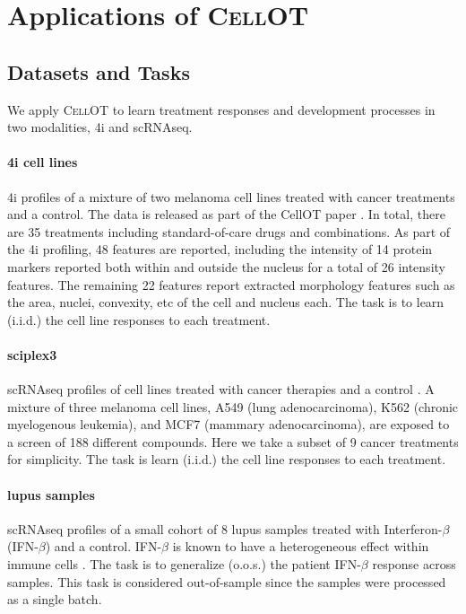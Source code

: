 \section{Applications of \textsc{CellOT}}
\subsection{Datasets and Tasks}

We apply \textsc{CellOT} to learn treatment responses and development processes in two modalities, 4i \cite{gut2018} and scRNAseq.

\paragraph{4i cell lines}
4i profiles of a mixture of two melanoma cell lines treated with cancer treatments and a control.
The data is released as part of the CellOT paper \cite{bunne2023}.
In total, there are 35 treatments including standard-of-care drugs and combinations.
As part of the 4i profiling, 48 features are reported, including the intensity of 14 protein markers reported both within and outside the nucleus for a total of 26 intensity features.
The remaining 22 features report extracted morphology features such as the area, nuclei, convexity, etc of the cell and nucleus each.
The task is to learn (i.i.d.) the cell line responses to each treatment.

\paragraph{sciplex3}
scRNAseq profiles of cell lines treated with cancer therapies and a control \cite{srivatsan2020}.
A mixture of three melanoma cell lines, A549 (lung adenocarcinoma), K562 (chronic myelogenous leukemia), and MCF7 (mammary adenocarcinoma), are exposed to a screen of 188 different compounds.
Here we take a subset of 9 cancer treatments for simplicity.
The task is learn (i.i.d.) the cell line responses to each treatment.

\paragraph{lupus samples}
scRNAseq profiles of a small cohort of 8 lupus samples treated with Interferon-$\beta$ (IFN-$\beta$) \cite{need} and a control.
IFN-$\beta$ is known to have a heterogeneous effect within immune cells \cite{stark1998,mostafavi2016}.
The task is to generalize (o.o.s.) the patient IFN-$\beta$ response across samples.
This task is considered out-of-sample since the samples were processed as a single batch.


